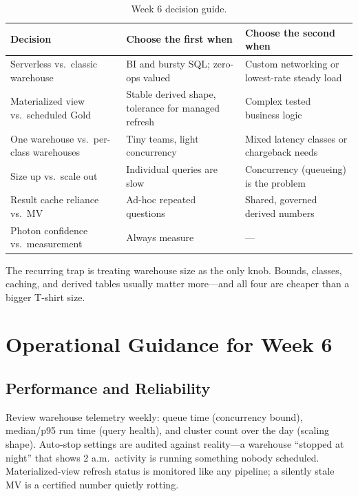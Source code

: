 \begin{table}[H]
\centering
\small
\begin{tabular}{@{}p{3.4cm}p{4.4cm}p{4.6cm}@{}}
\toprule
\textbf{Decision} & \textbf{Choose the first when} & \textbf{Choose the second when} \\
\midrule
Serverless vs.\ classic warehouse & BI and bursty SQL; zero-ops valued & Custom networking or lowest-rate steady load \\
Materialized view vs.\ scheduled Gold & Stable derived shape, tolerance for managed refresh & Complex tested business logic \\
One warehouse vs.\ per-class warehouses & Tiny teams, light concurrency & Mixed latency classes or chargeback needs \\
Size up vs.\ scale out & Individual queries are slow & Concurrency (queueing) is the problem \\
Result cache reliance vs.\ MV & Ad-hoc repeated questions & Shared, governed derived numbers \\
Photon confidence vs.\ measurement & Always measure & --- \\
\bottomrule
\end{tabular}
\caption{Week 6 decision guide.}
\label{tab:ch6-decisions}
\end{table}

The recurring trap is treating warehouse size as the only knob. Bounds, classes, caching, and derived tables usually matter more---and all four are cheaper than a bigger T-shirt size.

\section{Operational Guidance for Week 6}
%
\subsection{Performance and Reliability}
Review warehouse telemetry weekly: queue time (concurrency bound), median/p95 run time (query health), and cluster count over the day (scaling shape). Auto-stop settings are audited against reality---a warehouse ``stopped at night'' that shows 2 a.m.\ activity is running something nobody scheduled. Materialized-view refresh status is monitored like any pipeline; a silently stale MV is a certified number quietly rotting.

